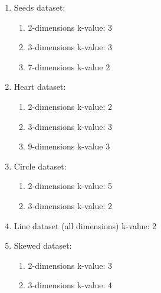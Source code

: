 \begin{enumerate}
    \item Seeds dataset:
    \begin{enumerate}
        \item 2-dimensions k-value: 3
        \item 3-dimensions k-value: 3
        \item 7-dimensions k-value 2
    \end{enumerate}
    \item     Heart dataset:
    \begin{enumerate}
        \item 2-dimensions k-value: 2
        \item 3-dimensions k-value: 3
        \item 9-dimensions k-value 3
    \end{enumerate}
    \item Circle dataset:
    \begin{enumerate}
        \item 2-dimensions k-value: 5
        \item 3-dimensions k-value: 2
    \end{enumerate}
    \item Line dataset (all dimensions) k-value: 2
    \item Skewed dataset:
    \begin{enumerate}
        \item 2-dimensions k-value: 3
        \item 3-dimensions k-value: 4
    \end{enumerate}
\end{enumerate}
\newpage
